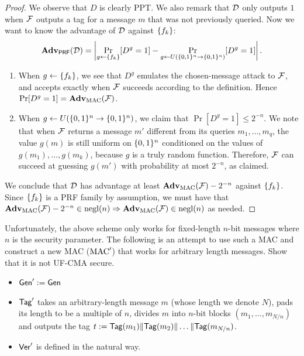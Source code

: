 \documentclass[11pt]{article}
\begin{document}
\begin{proof}
  We observe that $D$ is clearly PPT.  We also remark that $\mathcal{D}$
  only outputs $1$ when $\mathcal{F}$ outputs a tag for a message $m$ that
  was not previously queried.  Now we want to know the advantage of
  $\mathcal{D}$ against $\{f_k\}$:
  \[
  \mathbf{Adv}_{\mathsf{PRF}}(\mathcal{D}) = \left|\Pr_{g \gets \{f_k\}}[D^g = 1] -
    \Pr_{g \gets U(\{0,1\}^n \to \{0,1\}^n)}[D^g = 1]\right|.
  \]
  \begin{enumerate}
  \item When $g \gets \{f_k\}$, we see that $D^g$ emulates the
    chosen-message attack to $\mathcal{F}$, and accepts exactly when $\mathcal{F}$
    succeeds according to the definition.  Hence $\Pr[D^g = 1] =
    \mathbf{Adv}_{\text{MAC}}(\mathcal{F})$.
  \item When $g \gets U(\{0,1\}^n \to \{0,1\}^n)$, we claim that $\Pr[D^g =
    1] \leq 2^{-n}$.  We note that when $\mathcal{F}$ returns a message $m'$
    different from its queries $m_1,\dots,m_q$, the value $g(m)$ is
    still uniform on $\{0,1\}^n$ conditioned on the values of
    $g(m_1),\dots,g(m_k)$, because $g$ is a truly random function.
    Therefore, $\mathcal{F}$ can succeed at guessing $g(m')$ with probability
    at most $2^{-n}$, as claimed.
  \end{enumerate}
  We conclude that $\mathcal{D}$ has advantage at least $\mathbf{Adv}_{\text{MAC}}(\mathcal{F})
  - 2^{-n}$ against $\{f_k\}$.  Since $\{f_k\}$ is a PRF family by
  assumption, we must have that $\mathbf{Adv}_{\text{MAC}}(\mathcal{F}) - 2^{-n} \in
  \operatorname{negl}(n) \Rightarrow \mathbf{Adv}_{\text{MAC}}(\mathcal{F}) \in \operatorname{negl}(n)$ as needed.
\end{proof}

\begin{question}
  Unfortunately, the above scheme only works for fixed-length
  \(n\)-bit messages where \(n\) is the security parameter. The
  following is an attempt to use such a MAC and construct a new MAC
  (\(\text{MAC}'\)) that works for arbitrary length messages. Show that it
  is not UF-CMA secure.
  \begin{itemize}
  \item \(\mathsf{Gen}' := \mathsf{Gen}\)
  \item \(\mathsf{Tag}'\) takes an arbitrary-length message \(m\) (whose
    length we denote \(N\)), pads its length to be a multiple of
    \(n\), divides \(m\) into \(n\)-bit blocks
    \((m_1, \ldots, m_{N/n})\) and outputs the tag
    \(t := \mathsf{Tag}(m_1) \| \mathsf{Tag}(m_2) \| \ldots \|
    \mathsf{Tag}(m_{N/n})\).
  \item \(\mathsf{Ver}'\) is defined in the natural way.
  \end{itemize}
  \leavevmode
\end{question}
\end{document}
